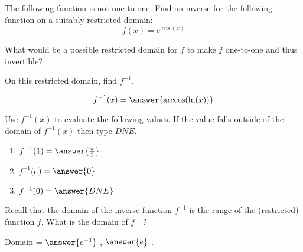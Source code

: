 \documentclass{ximera}
\author{David Kish}
\begin{document}
\begin{exercise}
The following function is not one-to-one.  Find an inverse for the following function on a suitably restricted domain:
\[
f(x)=e^{\cos(x)}
\]

What would be a possible restricted domain for $f$ to make $f$ one-to-one and thus invertible?

\begin{multipleChoice}
\choice[correct]{$\left[0,\pi\right]$}
\end{multipleChoice}

On this restricted domain, find $f^{-1}$.

\[
f^{-1}(x)=\answer{\arccos(\ln(x))}
\]

Use $f^{-1}(x)$ to evaluate the following values. If the value falls outside of the domain of $f^{-1}(x)$ then type $DNE$.\\

\begin{enumerate}
\item $f^{-1}(1)=\answer{\frac{\pi}{2}}$
\item $f^{-1}($e$)=\answer{0}$
\item $f^{-1}(0)=\answer{DNE}$
\end{enumerate}


Recall that the domain of the inverse function $f^{-1}$ is the range of the (restricted) function $f$.  What is the domain of $f^{-1}$?

Domain = \wordChoice{\choice{(}\choice[correct]{[}} $\answer{e^{-1}}$ , $\answer{e}$ \wordChoice{\choice{)}\choice[correct]{]}}.
\end{exercise}
\end{document}

